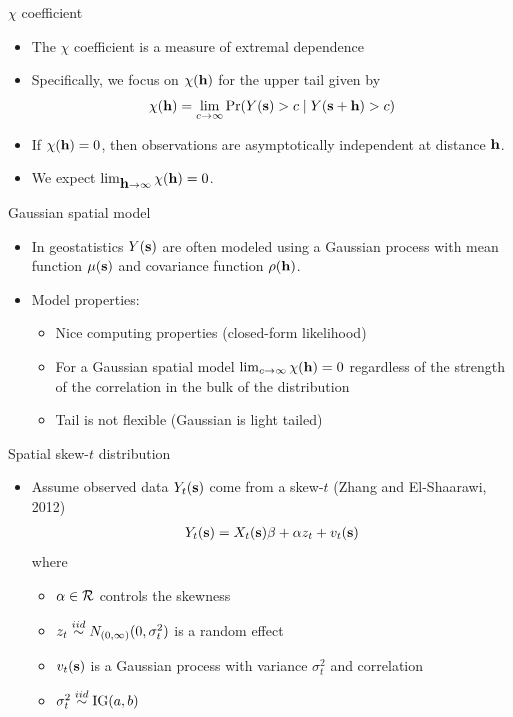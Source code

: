 \documentclass{beamer}
\begin{document}
\begin{frame}{$\chi$ coefficient}
  \begin{itemize} \setlength{\itemsep}{0.5em}
   \item The $\chi$ coefficient is a measure of extremal dependence
   \item Specifically, we focus on $\chi(\mbox{\bf h})$ for the upper tail given by
    \begin{align*}
      \chi(\mbox{\bf h}) = \lim_{c \rightarrow \infty}\Pr(Y(\mbox{\bf s}) > c \mid Y(\mbox{\bf s} + \mbox{\bf h}) > c)
    \end{align*}
    \item If $ \chi(\mbox{\bf h}) = 0$, then observations are asymptotically independent at distance $\mbox{\bf h}$.
    \item We expect $\lim_{\mbox{\bf h} \rightarrow \infty}\chi(\mbox{\bf h})=0$.
  \end{itemize}
\end{frame}

\begin{frame}{Gaussian spatial model}
  \begin{itemize} \setlength{\itemsep}{0.5em}
    \item In geostatistics $Y(\mbox{\bf s})$ are often modeled using a Gaussian process with mean function $\mu(\mbox{\bf s})$ and covariance function
$\rho(\mbox{\bf h})$.
    \item Model properties:
    \begin{itemize}
      \item Nice computing properties (closed-form likelihood)
    \item For a Gaussian spatial model $\lim_{c \rightarrow \infty} \chi(\mbox{\bf h}) = 0$ regardless of the strength of the correlation in the bulk of the distribution
    \item Tail is not flexible (Gaussian is light tailed)
    \end{itemize}
    \end{itemize}
\end{frame}

\begin{frame}{Spatial skew-$t$ distribution}
  \begin{itemize} \setlength{\itemsep}{0.5em}
    \item Assume observed data $Y_t(\mbox{\bf s})$ come from a skew-$t$ (Zhang and El-Shaarawi, 2012)
    \begin{align*}
      Y_t(\mbox{\bf s}) = X_t(\mbox{\bf s})\beta + \alpha z_t + v_t(\mbox{\bf s})
    \end{align*}
    where
    \begin{itemize} \setlength{\itemsep}{0.25em}
      \item $\alpha \in {\cal R}$ controls the skewness
      \item $z_t \stackrel{iid}{\sim} N_{(0, \infty)}(0, \sigma^2_t)$ is a random effect
      \item $v_t(\mbox{\bf s})$ is a Gaussian process with variance $\sigma^2_t$ and \Matern correlation
      \item $\sigma_t^2 \stackrel{iid}{\sim} \text{IG}(a, b)$
    \end{itemize}
  \end{itemize}
\end{frame}
\end{document}
